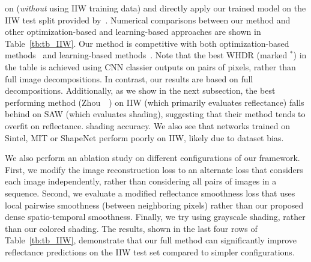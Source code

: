\documentclass[10pt,twocolumn,letterpaper]{article}
\begin{document}
on \BTShort (\emph{without} using IIW training data) and directly
apply our trained model on the IIW test split provided
by~\cite{narihira2015learning}. Numerical comparisons between our
method and other optimization-based and learning-based approaches are
shown in Table~\ref{tb:tb_IIW}.
Our method is competitive with both optimization-based
methods~\cite{bell2014intrinsic} and learning-based
methods~\cite{zhou2015learning}. Note that the best WHDR (marked
${}^*$) in the table is achieved using CNN classier outputs on pairs
of pixels, rather than full image decompositions. In contrast, our
results are based on full decompositions. Additionally, as we show in
the next subsection, the best performing method
(Zhou~\etal~\cite{zhou2015learning}) on IIW (which primarily evaluates
reflectance) falls behind on SAW (which evaluates shading), suggesting
that their method tends to overfit on reflectance. %
shading accuracy.
We also see that networks trained on Sintel, MIT or ShapeNet perform
poorly on IIW, likely due to dataset bias.

We also perform an ablation study on different configurations of our
framework. First, we modify the image reconstruction loss to an
alternate loss that considers each image independently, rather than
considering all pairs of images in a sequence. Second, we evaluate a
modified reflectance smoothness loss that uses local pairwise
smoothness (between neighboring pixels) rather than our proposed dense
spatio-temporal smoothness.
Finally, we try using grayscale shading, rather than our colored
shading. The results, shown in the last four rows of
Table~\ref{tb:tb_IIW}, demonstrate that our
full method can significantly improve reflectance predictions on the
IIW test set compared to simpler configurations.
\end{document}
